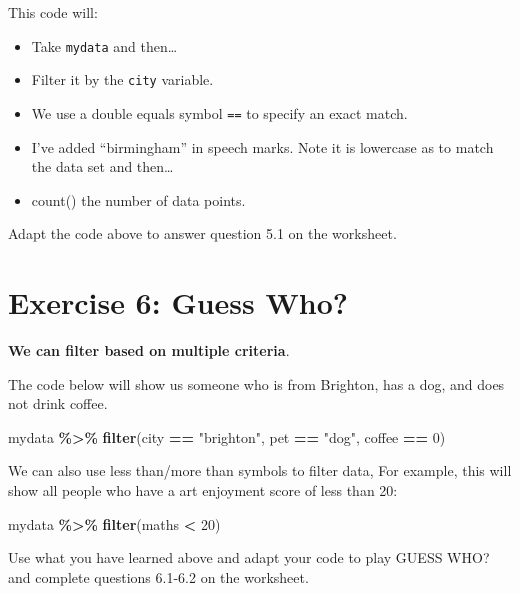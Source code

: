\documentclass[
]{book}
\newenvironment{Shaded}{\begin{snugshade}}{\end{snugshade}}
\newcommand{\DecValTok}[1]{\textcolor[rgb]{0.00,0.00,0.81}{#1}}
\newcommand{\FunctionTok}[1]{\textcolor[rgb]{0.13,0.29,0.53}{\textbf{#1}}}
\newcommand{\NormalTok}[1]{#1}
\newcommand{\SpecialCharTok}[1]{\textcolor[rgb]{0.81,0.36,0.00}{\textbf{#1}}}
\newcommand{\StringTok}[1]{\textcolor[rgb]{0.31,0.60,0.02}{#1}}
\let\oldsection\section
\renewcommand{\section}{\needspace{5\baselineskip}\oldsection}
\begin{document}
This code will:

\begin{itemize}
\item
  Take \texttt{mydata} and then\ldots{}
\item
  Filter it by the \texttt{city} variable.
\item
  We use a double equals symbol \texttt{==} to specify an exact match.
\item
  I've added ``birmingham'' in speech marks. Note it is lowercase as to match the data set and then\ldots{}
\item
  count() the number of data points.
\end{itemize}

Adapt the code above to answer question 5.1 on the worksheet.

\section{Exercise 6: Guess Who?}\label{exercise-6-guess-who}

\textbf{We can filter based on multiple criteria}.

The code below will show us someone who is from Brighton, has a dog, and does not drink coffee.

\begin{Shaded}
\begin{Highlighting}[]
\NormalTok{mydata }\SpecialCharTok{\%\textgreater{}\%}
  \FunctionTok{filter}\NormalTok{(city }\SpecialCharTok{==} \StringTok{"brighton"}\NormalTok{, pet }\SpecialCharTok{==} \StringTok{"dog"}\NormalTok{, coffee }\SpecialCharTok{==} \DecValTok{0}\NormalTok{)}
\end{Highlighting}
\end{Shaded}

We can also use less than/more than symbols to filter data, For example, this will show all people who have a art enjoyment score of less than 20:

\begin{Shaded}
\begin{Highlighting}[]
\NormalTok{mydata }\SpecialCharTok{\%\textgreater{}\%}
  \FunctionTok{filter}\NormalTok{(maths }\SpecialCharTok{\textless{}} \DecValTok{20}\NormalTok{)}
\end{Highlighting}
\end{Shaded}

Use what you have learned above and adapt your code to play GUESS WHO? and complete questions 6.1-6.2 on the worksheet.
\end{document}
